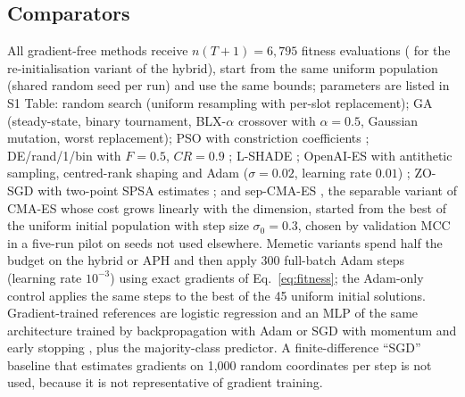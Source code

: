\documentclass[10pt,letterpaper]{article}
\begin{document}
\subsection{Comparators}
All gradient-free methods receive $n(T+1)=6{,}795$ fitness evaluations (\EvalsReinit{} for the re-initialisation variant of the hybrid), start from the same uniform population (shared random seed per run) and use the same bounds; parameters are listed in S1 Table:
random search (uniform resampling with per-slot replacement);
GA (steady-state, binary tournament, BLX-$\alpha$ crossover with $\alpha=0.5$, Gaussian mutation, worst replacement);
PSO with constriction coefficients \citep{kennedy1995pso,clerc2002constriction};
DE/rand/1/bin with $F=0.5$, $CR=0.9$ \citep{storn1997de};
L-SHADE \citep{tanabe2014lshade};
OpenAI-ES with antithetic sampling, centred-rank shaping and Adam ($\sigma=0.02$, learning rate $0.01$) \citep{salimans2017es};
ZO-SGD with two-point SPSA estimates \citep{spall1992spsa,malladi2023mezo};
and sep-CMA-ES \citep{ros2008sepcma}, the separable variant of CMA-ES whose cost grows linearly with the dimension, started from the best of the uniform initial population with step size $\sigma_0=0.3$, chosen by validation MCC in a five-run pilot on seeds not used elsewhere.
Memetic variants spend half the budget on the hybrid or APH and then apply 300 full-batch Adam steps \citep{kingma2015adam} (learning rate $10^{-3}$) using exact gradients of Eq.~\eqref{eq:fitness}; the Adam-only control applies the same steps to the best of the 45 uniform initial solutions.
Gradient-trained references are logistic regression and an MLP of the same architecture trained by backpropagation with Adam or SGD with momentum and early stopping \citep{pedregosa2011sklearn}, plus the majority-class predictor. A finite-difference ``SGD'' baseline that estimates gradients on 1,000 random coordinates per step is not used, because it is not representative of gradient training.
\end{document}
